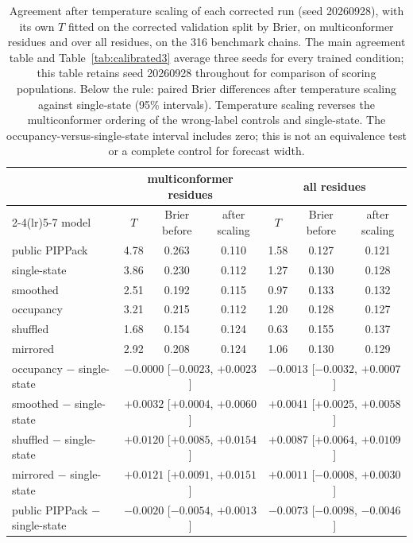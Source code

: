\documentclass[10pt,a4paper]{article}
\begin{document}
\begin{table}[!htbp]
\centering
\caption{Agreement after temperature scaling of each corrected run (seed 20260928), with
its own $T$ fitted on the corrected validation split by Brier, on multiconformer residues
and over all residues, on the 316 benchmark chains. The main agreement table and Table~\ref{tab:calibrated3} average three seeds for every trained condition; this table retains seed 20260928 throughout for comparison of scoring populations. Below the rule: paired Brier differences after temperature scaling
against single-state (95\% intervals). Temperature scaling reverses the
multiconformer ordering of the wrong-label controls and single-state. The
occupancy-versus-single-state interval includes zero; this is not an equivalence
test or a complete control for forecast width.}
\label{tab:calibrated}
\scriptsize\setlength{\tabcolsep}{3pt}
\begin{tabular}{@{}lcccccc@{}}
\toprule
 & \multicolumn{3}{c}{multiconformer residues} & \multicolumn{3}{c}{all residues} \\
\cmidrule(lr){2-4}\cmidrule(lr){5-7}
model & $T$ & Brier before & after scaling & $T$ & Brier before & after scaling \\
\midrule
public PIPPack & 4.78 & 0.263 & 0.110 & 1.58 & 0.127 & 0.121 \\
single-state & 3.86 & 0.230 & 0.112 & 1.27 & 0.130 & 0.128 \\
smoothed & 2.51 & 0.192 & 0.115 & 0.97 & 0.133 & 0.132 \\
occupancy & 3.21 & 0.215 & 0.112 & 1.20 & 0.128 & 0.127 \\
shuffled & 1.68 & 0.154 & 0.124 & 0.63 & 0.155 & 0.137 \\
mirrored & 2.92 & 0.208 & 0.124 & 1.06 & 0.130 & 0.129 \\
\midrule
occupancy $-$ single-state & \multicolumn{3}{c}{$-0.0000$ [$-0.0023$, $+0.0023$]} & \multicolumn{3}{c}{$-0.0013$ [$-0.0032$, $+0.0007$]} \\
smoothed $-$ single-state & \multicolumn{3}{c}{$+0.0032$ [$+0.0004$, $+0.0060$]} & \multicolumn{3}{c}{$+0.0041$ [$+0.0025$, $+0.0058$]} \\
shuffled $-$ single-state & \multicolumn{3}{c}{$+0.0120$ [$+0.0085$, $+0.0154$]} & \multicolumn{3}{c}{$+0.0087$ [$+0.0064$, $+0.0109$]} \\
mirrored $-$ single-state & \multicolumn{3}{c}{$+0.0121$ [$+0.0091$, $+0.0151$]} & \multicolumn{3}{c}{$+0.0011$ [$-0.0008$, $+0.0030$]} \\
public PIPPack $-$ single-state & \multicolumn{3}{c}{$-0.0020$ [$-0.0054$, $+0.0013$]} & \multicolumn{3}{c}{$-0.0073$ [$-0.0098$, $-0.0046$]} \\
\bottomrule
\end{tabular}
\end{table}
\end{document}
